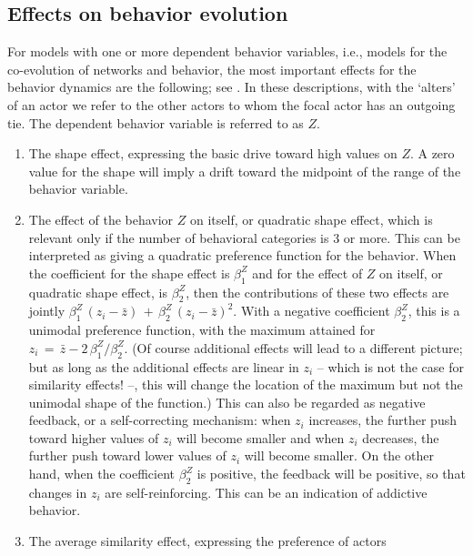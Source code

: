 \documentclass[a4paper,fleqn,11pt]{article}
\newcommand{\+}{\, + \,}
\begin{document}
\subsection{Effects on behavior evolution}
\label{S_eff_beh}

For models with one or more dependent behavior variables, i.e.,
models for the co-evolution of networks and behavior,
the most important effects for the behavior dynamics are the following;
see \citet*{SteglichEA10}.
In these descriptions, with the `alters' of an actor
we refer to the other actors to whom
the focal actor has an outgoing tie.
The dependent behavior variable is referred to as $Z$.
\begin{enumerate}
\item The shape effect, expressing the basic drive toward high values on $Z$.
      A zero value for the shape will imply a drift toward the midpoint
      of the range of the behavior variable.
\item The effect of the behavior $Z$ on itself,
      or quadratic shape effect, which is relevant
      only if the number of behavioral categories is 3 or more.
      This can be interpreted as giving a quadratic preference function
      for the behavior.
      When the coefficient for the shape effect is $\beta^Z_1$ and for the
      effect of $Z$ on itself, or quadratic shape effect, is $\beta^Z_2$,
      then the contributions
      of these two effects are jointly $\beta^Z_1\, (z_i - \bar z) \,+\,
                   \beta^Z_2\, (z_i - \bar z)^2$.
      With a negative coefficient $\beta^Z_2$, this
      is a unimodal preference function, with the maximum attained
      for $z_i \,=\, \bar z - 2\,\beta^Z_1/\beta^Z_2$.
      (Of course additional effects will lead to a different picture;
      but as long as the additional effects are linear in $z_i$ -- which is not
      the case for similarity effects! --, this will change the location of the maximum
      but not the unimodal shape of the function.)
      This can also be regarded as negative feedback, or a self-correcting
      mechanism: when $z_i$ increases, the further push toward higher values
      of $z_i$ will become smaller and when $z_i$ decreases, the further push toward lower values
      of $z_i$ will become smaller. On the other hand, when the coefficient $\beta^Z_2$
      is positive, the feedback will be positive, so that changes in $z_i$
      are self-reinforcing. This can be an indication of addictive behavior.
\item The average similarity effect, expressing the preference of actors

\end{enumerate}
\end{document}
